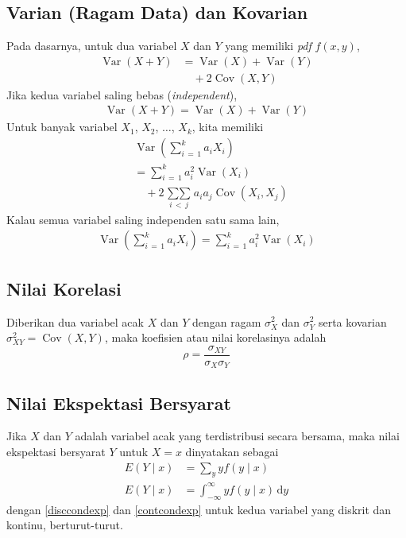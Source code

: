 \documentclass[a4paper,extrafontsizes, 9pt]{memoir}
\DeclareMathOperator{\Cov}{Cov}
\DeclareMathOperator{\Var}{Var}
\begin{document}
\begin{multicols}{3}
			\subsection*{\small Varian (Ragam Data) dan Kovarian}
				Pada dasarnya, untuk dua variabel $X$ dan $Y$ yang memiliki \textsl{pdf} $f(x, y)$,
					\begin{align*}
						\Var(X + Y) & = \Var(X) + \Var(Y)\\
						& \quad + 2\Cov(X, Y)
					\end{align*}
				Jika kedua variabel saling bebas (\textsl{independent}),
					\begin{align*}
						\Var(X + Y) = \Var(X) + \Var(Y)
					\end{align*}
				Untuk banyak variabel $X_{1}$, $X_{2}$, $\ldots$, $X_{k}$, kita memiliki
					\begin{align*}
						& \Var\left(\sum_{i\, = \, 1}^{k}a_{i}X_{i}\right)\\
						& = \sum_{i\, = \, 1}^{k}a_{i}^{2}\Var\left(X_{i}\right)\\
						& \quad + 2 \mathop{\sum\sum}\limits_{i\, < \, j}a_{i}a_{j}\Cov(X_{i}, X_{j})
					\end{align*}
				Kalau semua variabel saling independen satu sama lain,
					\begin{align*}
						\Var\left(\sum_{i\, = \, 1}^{k}a_{i}X_{i}\right) = \sum_{i\, = \, 1}^{k}a_{i}^{2}\Var\left(X_{i}\right)
					\end{align*}
					
			\subsection*{\small Nilai Korelasi}
				Diberikan dua variabel acak $X$ dan $Y$ dengan ragam $\sigma_{X}^{2}$ dan $\sigma_{Y}^{2}$ serta kovarian $\sigma_{XY}^{2} = \Cov(X, Y)$, maka koefisien atau nilai korelasinya adalah
					\[
						\rho = \dfrac{\sigma_{XY}}{\sigma_{X}\sigma_{Y}}
					\] 
					
			\subsection*{\small Nilai Ekspektasi Bersyarat}
				Jika $X$ dan $Y$ adalah variabel acak yang terdistribusi secara bersama, maka nilai ekspektasi bersyarat $Y$ untuk $X = x$ dinyatakan sebagai
					\begin{align}
						E(Y \mid x) & = \sum_{y}yf(y\mid x) \label{disccondexp}\\
						E(Y \mid x) & = \int_{-\infty}^{\infty}yf(y \mid x)\, \mathrm{d}y \label{contcondexp}
					\end{align}
				dengan \eqref{disccondexp} dan \eqref{contcondexp} untuk kedua variabel yang diskrit dan kontinu, berturut-turut.
				

\end{multicols}
\end{document}
